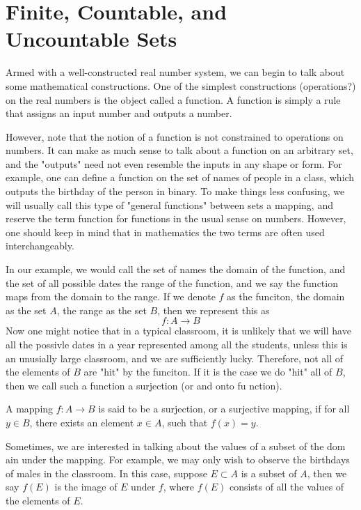 \documentclass[../../templates/section]{subfiles}
\begin{document}
\section{Finite, Countable, and Uncountable Sets}
Armed with a well-constructed real number system, we can begin to talk about
some mathematical constructions. One of the simplest constructions 
(operations?) on the real numbers is the object called a function. A function
is simply a rule that assigns an input number and outputs a number. 

However, note that the notion of a function is not
constrained to operations on numbers. It can make as much sense to talk about a 
function on an arbitrary set, and the "outputs" need not even resemble the 
inputs in any shape or form. For example, one can define a function on the set
of names of people in a class, which outputs the birthday of the person in
binary. To make things less confusing, we will usually call this type of 
"general functions" between sets a mapping, and reserve the term function for 
functions in the usual sense on numbers. However, one should keep in mind that
in mathematics the two terms are often used interchangeably.

In our example, we would call the set of names the domain of the function, and
the set of all possible dates the range of the function, and we say the function
maps from the domain to the range. If we denote $f$ as the funciton, the domain
as the set $A$, the range as the set $B$, then we represent this as
\[
f:A\rightarrow B
\]
Now one might notice that in a typical classroom, it is unlikely that we will 
have all the possivle dates in a year represented among all the students, unless
this is an unusially large classroom, and we are sufficiently lucky. Therefore,
not all of the elements of $B$ are "hit" by the funciton. If it is the case we 
do "hit" all of $B$, then we call such a function a surjection (or and onto fu
nction). 

\begin{definition}
A mapping $f:A\rightarrow B$ is said to be a surjection, or a surjective
mapping, if for all $y\in B$, there exists an element $x\in A$, such that
$f(x) = y$.
\end{definition}

Sometimes, we are interested in talking about the values of a subset of the dom
ain under the mapping. For example, we may only wish to observe the birthdays 
of males in the classroom. In this case, suppose $E \subset A$ is a subset of 
$A$, then we say $f(E)$ is the image of $E$ under $f$, where $f(E)$ consists of 
all the values of the elements of $E$.
\end{document}

